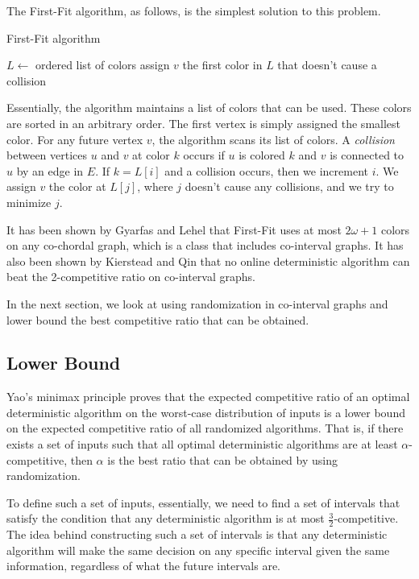 The First-Fit algorithm, as follows, is the simplest solution to this problem.

\begin{algorithm}
\caption{First-Fit algorithm}
$L \leftarrow$ ordered list of colors\;
 {
  assign $v$ the first color in $L$ that doesn't cause a collision\;
}
\end{algorithm}

Essentially, the algorithm maintains a list of colors that can be used. These colors are sorted in an arbitrary order. The first vertex is simply assigned the smallest color. For any future vertex $v$, the algorithm scans its list of colors. A \emph{collision} between vertices $u$ and $v$ at color $k$ occurs if $u$ is colored $k$ and $v$ is connected to $u$ by an edge in $E$. If $k = L[i]$ and a collision occurs, then we increment $i$. We assign $v$ the color at $L[j]$, where $j$ doesn't cause any collisions, and we try to minimize $j$.

It has been shown by Gyarfas and Lehel \cite{gyarfas} that First-Fit uses at most $2\omega+1$ colors on any co-chordal graph, which is a class that includes co-interval graphs. It has also been shown by Kierstead and Qin \cite{kierstead} that no online deterministic algorithm can beat the 2-competitive ratio on co-interval graphs.

In the next section, we look at using randomization in co-interval graphs and lower bound the best competitive ratio that can be obtained.
\subsection{Lower Bound}
Yao's minimax principle proves that the expected competitive ratio of an optimal deterministic algorithm on the worst-case distribution of inputs is a lower bound on the expected competitive ratio of all randomized algorithms. That is, if there exists a set of inputs such that all optimal deterministic algorithms are at least $\alpha$-competitive, then $\alpha$ is the best ratio that can be obtained by using randomization.

To define such a set of inputs, essentially, we need to find a set of intervals that satisfy the condition that any deterministic algorithm is at most $\frac{3}{2}$-competitive. The idea behind constructing such a set of intervals is that any deterministic algorithm will make the same decision on any specific interval given the same information, regardless of what the future intervals are.

